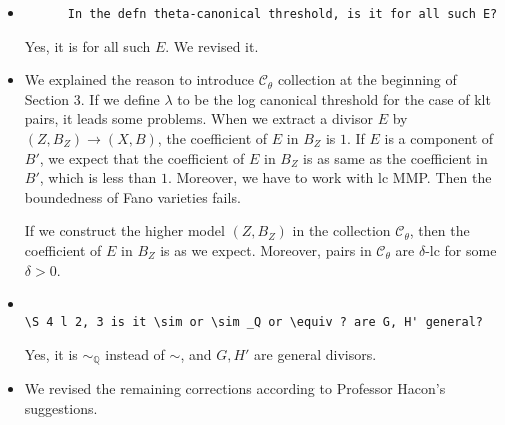 \documentclass[11pt]{article}
\begin{document}
\begin{itemize}
  \bigskip
  
  \item
  \begin{verbatim}
      In the defn theta-canonical threshold, is it for all such E?
  \end{verbatim}
  
  Yes, it is for all such $E$. We revised it.
  
  \bigskip
  
  \item We explained the reason to introduce $\mathcal{C}_{\theta}$ collection at the beginning of Section 3. If we define $\lambda$ to be the log canonical threshold for the case of klt pairs, it leads some problems. When we extract a divisor $E$ by $(Z,B_Z)\to (X,B)$, the coefficient of $E$ in $B_Z$ is $1$. If $E$ is a component of $B'$, we expect that the coefficient of $E$ in $B_Z$ is as same as the coefficient in $B'$, which is less than $1$.  Moreover, we have to work with lc MMP. Then the boundedness of Fano varieties fails.
 
 If we construct the higher model $(Z,B_Z)$ in the collection $\mathcal{C}_{\theta}$, then the coefficient of $E$ in $B_Z$ is as we expect. Moreover, pairs in $\mathcal{C}_{\theta}$ are $\delta$-lc for some $\delta>0$.
  
  
  \bigskip
  
  \item
  \begin{verbatim}
      
\S 4 l 2, 3 is it \sim or \sim _Q or \equiv ? are G, H' general? 

  \end{verbatim}
Yes, it is $\sim_\mathbb{Q}$ instead of  $\sim$, and $G,H'$ are general divisors.

\bigskip

 \item We revised the remaining corrections according to  Professor Hacon's suggestions.

\end{itemize}
\end{document}
